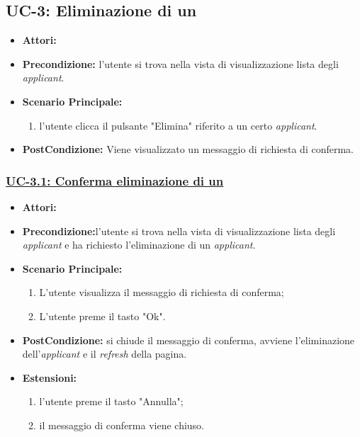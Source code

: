 \subsection{UC-3: Eliminazione di un\applicant}
\begin{itemize}
\item \textbf{Attori:}\loggedusr
\item \textbf{Precondizione:} l'utente si trova nella vista di visualizzazione lista degli \textit{applicant}.
\item \textbf{Scenario Principale:}
\begin{enumerate}
	\item l'utente clicca il pulsante "Elimina" riferito a un certo \textit{applicant}.
\end{enumerate}
\item \textbf{PostCondizione:} Viene visualizzato un messaggio di richiesta di conferma.
\end{itemize}

\subsubsection{\underline{UC-3.1: Conferma eliminazione di un\applicant}}
\begin{itemize}
	\item \textbf{Attori:}\loggedusr
	\item \textbf{Precondizione:}l'utente si trova nella vista di visualizzazione lista degli \textit{applicant} e ha richiesto l'eliminazione di un \textit{applicant}.
	\item \textbf{Scenario Principale:}
	\begin{enumerate}
		\item L'utente visualizza il messaggio di richiesta di conferma;
		\item L'utente preme il tasto "Ok".
	\end{enumerate}
	\item \textbf{PostCondizione:} si chiude il messaggio di conferma, avviene l'eliminazione dell'\textit{applicant} e il \textit{refresh} della pagina.
	\item \textbf{Estensioni:} 
	\begin{enumerate}
		\item l'utente preme il tasto "Annulla";
		\item il messaggio di conferma viene chiuso.
	\end{enumerate}
\end{itemize}

